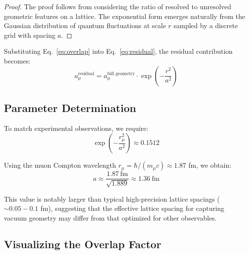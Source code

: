 ﻿\documentclass[12pt]{article}
\theoremstyle{definition}
\theoremstyle{plain}
\begin{document}
\begin{proof}
The proof follows from considering the ratio of resolved to unresolved geometric features on a lattice. The exponential form emerges naturally from the Gaussian distribution of quantum fluctuations at scale $r$ sampled by a discrete grid with spacing $a$.
\end{proof}


Substituting Eq.~\eqref{eq:overlap} into Eq.~\eqref{eq:residual}, the residual contribution becomes:
\begin{equation}
a_\mu^{\text{residual}} = a_\mu^{\text{full geometry}} \cdot \exp\left(-\frac{r^2}{a^2}\right)
\label{eq:residual_final}
\end{equation}


\subsection{Parameter Determination}


To match experimental observations, we require:
\begin{equation}
\exp\left(-\frac{r_\mu^2}{a^2}\right) \approx 0.1512
\end{equation}


Using the muon Compton wavelength $r_\mu = \hbar/(m_\mu c) \approx 1.87$ fm, we obtain:
\begin{equation}
a \approx \frac{1.87~\text{fm}}{\sqrt{1.889}} \approx 1.36~\text{fm}
\label{eq:lattice_spacing}
\end{equation}


This value is notably larger than typical high-precision lattice spacings ($\sim 0.05-0.1$ fm), suggesting that the effective lattice spacing for capturing vacuum geometry may differ from that optimized for other observables.


\subsection{Visualizing the Overlap Factor}
\end{document}
